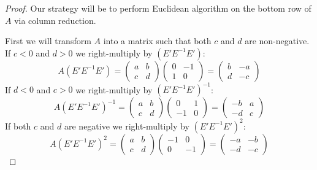 \documentclass{article}
\theoremstyle{definition}
\begin{document}
\begin{proof}

Our strategy will be to perform Euclidean algorithm on the bottom row of $A$ via column reduction. 

First we will transform $A$ into a matrix such that both $c$ and $d$ are non-negative.
If $c < 0$ and $d > 0$ we right-multiply by $(E' E^{-1} E')$:
\[
    A (E' E^{-1} E') =   
    \begin{pmatrix}
        a & b \\
        c & d
    \end{pmatrix}
    \begin{pmatrix}
        0 & -1 \\
        1 & 0
    \end{pmatrix}
    =
    \begin{pmatrix}
        b & -a \\
        d & -c
    \end{pmatrix}
\]
If $d < 0$ and $c > 0$ we right-multiply by $(E' E^{-1} E')^{-1}$:
\[
    A (E' E^{-1} E')^{-1} =   
    \begin{pmatrix}
        a & b \\
        c & d
    \end{pmatrix}
    \begin{pmatrix}
        0 & 1 \\
        -1 & 0
    \end{pmatrix}
    =
    \begin{pmatrix}
        -b & a \\
        -d & c
    \end{pmatrix}
\]
If both $c$ and $d$ are negative we right-multiply by $(E' E^{-1} E')^2$:
\[
    A (E' E^{-1} E')^2 =   
    \begin{pmatrix}
        a & b \\
        c & d
    \end{pmatrix}
    \begin{pmatrix}
        -1 & 0 \\
        0 & -1
    \end{pmatrix}
    =
    \begin{pmatrix}
        -a & -b \\
        -d & -c
    \end{pmatrix}
\]


\end{proof}
\end{document}
